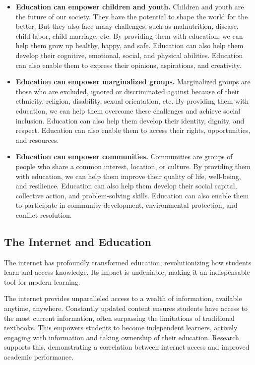\documentclass[a4paper,11pt]{article}
\begin{document}
\begin{itemize}
	\item \textbf{Education can empower children and youth.}
	 Children and youth are the future of our society. They have the potential to shape the world for the better. But they also face many challenges, such as malnutrition, disease, child labor, child marriage, etc. By providing them with education, we can help them grow up healthy, happy, and safe. Education can also help them develop their cognitive, emotional, social, and physical abilities. Education can also enable them to express their opinions, aspirations, and creativity.
	\item \textbf{Education can empower marginalized groups.}
	 Marginalized groups are those who are excluded, ignored or discriminated against because of their ethnicity, religion, disability, sexual orientation, etc. By providing them with education, we can help them overcome these challenges and achieve social inclusion. Education can also help them develop their identity, dignity, and respect. Education can also enable them to access their rights, opportunities, and resources.
	\item \textbf{Education can empower communities.}
	 Communities are groups of people who share a common interest, location, or culture. By providing them with education, we can help them improve their quality of life, well-being, and resilience. Education can also help them develop their social capital, collective action, and problem-solving skills. Education can also enable them to participate in community development, environmental protection, and conflict resolution.
\end{itemize}



\subsection{The Internet and Education} 

The internet has profoundly transformed education, revolutionizing how students learn and access knowledge. Its impact is undeniable, making it an indispensable tool for modern learning.\cite{how-internet-beneficial-students}

The internet provides unparalleled access to a wealth of information, available anytime, anywhere.  Constantly updated content ensures students have access to the most current information, often surpassing the limitations of traditional textbooks. This empowers students to become independent learners, actively engaging with information and taking ownership of their education. Research supports this, demonstrating a correlation between internet access and improved academic performance.\cite{how-much-data-internet-each-day}
\end{document}
